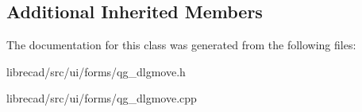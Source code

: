 \subsection*{Additional Inherited Members}


The documentation for this class was generated from the following files\-:\begin{DoxyCompactItemize}
\item 
librecad/src/ui/forms/qg\-\_\-dlgmove.\-h\item 
librecad/src/ui/forms/qg\-\_\-dlgmove.\-cpp\end{DoxyCompactItemize}
